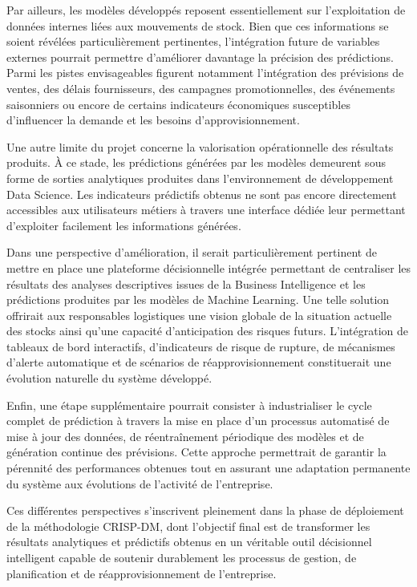 Par ailleurs, les modèles développés reposent essentiellement sur l'exploitation de données internes liées aux mouvements de stock. Bien que ces informations se soient révélées particulièrement pertinentes, l'intégration future de variables externes pourrait permettre d'améliorer davantage la précision des prédictions. Parmi les pistes envisageables figurent notamment l'intégration des prévisions de ventes, des délais fournisseurs, des campagnes promotionnelles, des événements saisonniers ou encore de certains indicateurs économiques susceptibles d'influencer la demande et les besoins d'approvisionnement.
 
Une autre limite du projet concerne la valorisation opérationnelle des résultats produits. À ce stade, les prédictions générées par les modèles demeurent sous forme de sorties analytiques produites dans l'environnement de développement Data Science. Les indicateurs prédictifs obtenus ne sont pas encore directement accessibles aux utilisateurs métiers à travers une interface dédiée leur permettant d'exploiter facilement les informations générées.
 
Dans une perspective d'amélioration, il serait particulièrement pertinent de mettre en place une plateforme décisionnelle intégrée permettant de centraliser les résultats des analyses descriptives issues de la Business Intelligence et les prédictions produites par les modèles de Machine Learning. Une telle solution offrirait aux responsables logistiques une vision globale de la situation actuelle des stocks ainsi qu'une capacité d'anticipation des risques futurs. L'intégration de tableaux de bord interactifs, d'indicateurs de risque de rupture, de mécanismes d'alerte automatique et de scénarios de réapprovisionnement constituerait une évolution naturelle du système développé.
 
Enfin, une étape supplémentaire pourrait consister à industrialiser le cycle complet de prédiction à travers la mise en place d'un processus automatisé de mise à jour des données, de réentraînement périodique des modèles et de génération continue des prévisions. Cette approche permettrait de garantir la pérennité des performances obtenues tout en assurant une adaptation permanente du système aux évolutions de l'activité de l'entreprise.
 
Ces différentes perspectives s'inscrivent pleinement dans la phase de déploiement de la méthodologie CRISP-DM, dont l'objectif final est de transformer les résultats analytiques et prédictifs obtenus en un véritable outil décisionnel intelligent capable de soutenir durablement les processus de gestion, de planification et de réapprovisionnement de l'entreprise.
 
